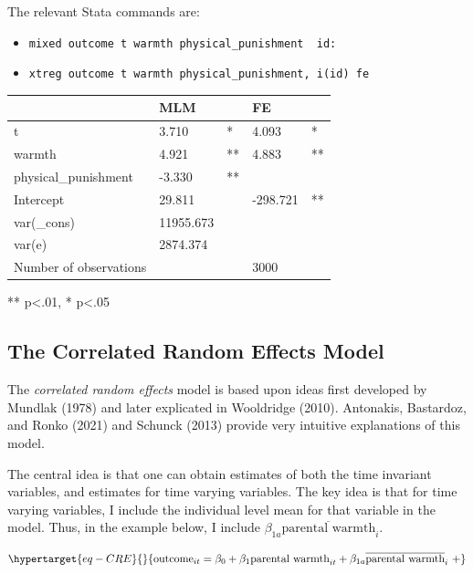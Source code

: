 \documentclass[
  letterpaper,
  DIV=11,
  numbers=noendperiod]{scrreprt}
\providecommand{\tightlist}{%
  \setlength{\itemsep}{0pt}\setlength{\parskip}{0pt}}\usepackage{longtable,booktabs,array}
\begin{document}
The relevant Stata commands are:

\begin{itemize}
\tightlist
\item
  \texttt{mixed\ outcome\ t\ warmth\ physical\_punishment\ \textbar{}\textbar{}\ id:}
\item
  \texttt{xtreg\ outcome\ t\ warmth\ physical\_punishment,\ i(id)\ fe}
\end{itemize}

\begin{longtable}[]{@{}lllll@{}}
\toprule()
& MLM & & FE & \\
\midrule()
\endhead
t & 3.710 & * & 4.093 & * \\
warmth & 4.921 & ** & 4.883 & ** \\
physical\_punishment & -3.330 & ** & & \\
Intercept & 29.811 & & -298.721 & ** \\
var(\_cons) & 11955.673 & & & \\
var(e) & 2874.374 & & & \\
Number of observations & & & 3000 & \\
\bottomrule()
\end{longtable}

** p\textless.01, * p\textless.05

\hypertarget{the-correlated-random-effects-model}{%
\subsection{The Correlated Random Effects
Model}\label{the-correlated-random-effects-model}}

The \emph{correlated random effects} model is based upon ideas first
developed by Mundlak (1978) and later explicated in Wooldridge (2010).
Antonakis, Bastardoz, and Ronko (2021) and Schunck (2013) provide very
intuitive explanations of this model.

The central idea is that one can obtain estimates of both the time
invariant variables, and estimates for time varying variables. The key
idea is that for time varying variables, I include the individual level
mean for that variable in the model. Thus, in the example below, I
include \(\beta_{1a}\overline{\text{parental warmth}}_{i}\).

\begin{equation}\protect\hypertarget{eq-CRE}{}{\text{outcome}_{it} = \beta_0 + \beta_1 \text{parental warmth}_{it} + \beta_{1a}\overline{\text{parental warmth}}_{i} \ + }\label{eq-CRE}\end{equation}
\end{document}
